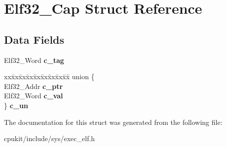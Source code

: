 \hypertarget{structElf32__Cap}{}\section{Elf32\+\_\+\+Cap Struct Reference}
\label{structElf32__Cap}
\subsection*{Data Fields}
\begin{DoxyCompactItemize}
\item 
\mbox{\label{structElf32__Cap_a99cbb38e312e8da513b80ed4f8abea91}} 
Elf32\+\_\+\+Word {\bfseries c\+\_\+tag}
\item 
\mbox{\label{structElf32__Cap_ad0e9c7e25f79b031534015c30c9dc945}} 
\begin{tabbing}
xx\=xx\=xx\=xx\=xx\=xx\=xx\=xx\=xx\=\kill
union \{\\
\>Elf32\_Addr {\bfseries c\_ptr}\\
\>Elf32\_Word {\bfseries c\_val}\\
\} {\bfseries c\_un}\\

\end{tabbing}\end{DoxyCompactItemize}


The documentation for this struct was generated from the following file\+:\begin{DoxyCompactItemize}
\item 
cpukit/include/sys/exec\+\_\+elf.\+h\end{DoxyCompactItemize}
